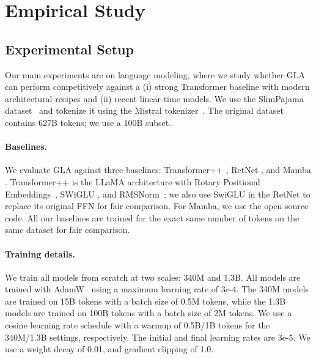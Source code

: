 


\vspace{-2mm}
\section{Empirical Study}
\vspace{-2mm}
\label{sec:experiments}

\subsection{Experimental Setup}
\vspace{-2mm}
Our main experiments are on language modeling, where we study whether  GLA  can perform competitively against a (i) strong Transformer baseline with modern architectural recipes and (ii) recent linear-time models. We use the SlimPajama dataset~\citep{cerebras2023slimpajama} and tokenize it using the Mistral tokenizer~\citep{jiang2023mistral}. The original dataset contains 627B tokens; we use a 100B subset.





\vspace{-2mm}
\paragraph{Baselines.} We evaluate  GLA  against three baselines: Transformer++ \citep{touvron2023llama}, RetNet \citep{sun2023retentive}, and Mamba \citep{Gu2023MambaLS}. 
Transformer++ is the LLaMA  architecture with Rotary Positional Embeddings~\citep{rope}, SWiGLU \citep{shazeer2020glu}, and RMSNorm~\citep{rmsnorm}; we also use SwiGLU in the RetNet to replace its original FFN for fair comparison. For Mamba, we use the open source code. All our baselines are trained for the exact same number of tokens on the same dataset for fair comparison.

\vspace{-2mm}
\paragraph{Training details.} We train all models from scratch at two scales: 340M and 1.3B.  All models are trained with AdamW~\citep{loshchilov2018fixing} using a maximum learning rate of 3e-4. The 340M models are trained on 15B tokens with a batch size of 0.5M tokens, while the 1.3B models are trained on 100B tokens with a batch size of 2M tokens. We use a cosine learning rate schedule with a warmup of 0.5B/1B tokens for the 340M/1.3B settings, respectively. The initial and final learning rates are 3e-5. We use a weight decay of 0.01, and gradient clipping of 1.0.



